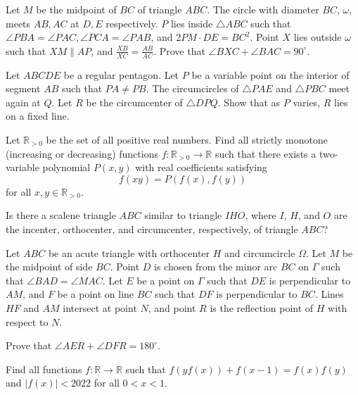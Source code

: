 \documentclass[11pt]{scrartcl}
\begin{document}
\begin{problem}[591652153716935]
	Let $M$ be the midpoint of $BC$ of triangle $ABC$. The circle with diameter $BC$, $\omega$, meets $AB,AC$ at $D,E$ respectively. $P$ lies inside $\triangle ABC$ such that $\angle PBA=\angle PAC, \angle PCA=\angle PAB$, and $2PM\cdot DE=BC^2$. Point $X$ lies outside $\omega$ such that $XM\parallel AP$, and $\frac{XB}{XC}=\frac{AB}{AC}$. Prove that $\angle BXC +\angle BAC=90^{\circ}$.
\end{problem}
\begin{problem}[6020628633767269011]
Let \(ABCDE\) be a regular pentagon. Let \(P\) be a variable point on the interior of segment \(AB\) such that \(PA\ne PB\). The circumcircles of \(\triangle PAE\) and \(\triangle PBC\) meet again at \(Q\). Let \(R\) be the circumcenter of \(\triangle DPQ\). Show that as \(P\) varies, \(R\) lies on a fixed line.
\end{problem}
\begin{problem}[361772755079059]
Let $\mathbb{R}_{>0}$ be the set of all positive real numbers. Find all strictly monotone (increasing or decreasing) functions $f:\mathbb{R}_{>0} \to \mathbb{R}$ such that there exists a two-variable polynomial $P(x, y)$ with real coefficients satisfying
$$
f(xy)=P(f(x), f(y))
$$for all $x, y\in\mathbb{R}_{>0}$.
\end{problem}
\begin{problem}[2672133756769464425]
Is there a scalene triangle $ABC$ similar to triangle $IHO$, where $I$, $H$, and $O$ are the incenter, orthocenter, and circumcenter, respectively, of triangle $ABC$?
\end{problem}
\begin{problem}[227919487650283]
Let $ABC$ be an acute triangle with orthocenter $H$ and circumcircle $\Omega$. Let $M$ be the midpoint of side $BC$. Point $D$ is chosen from the minor arc $BC$ on $\Gamma$ such that $\angle BAD = \angle MAC$. Let $E$ be a point on $\Gamma$ such that $DE$ is perpendicular to $AM$, and $F$ be a point on line $BC$ such that $DF$ is perpendicular to $BC$. Lines $HF$ and $AM$ intersect at point $N$, and point $R$ is the reflection point of $H$ with respect to $N$.

Prove that $\angle AER + \angle DFR = 180^\circ$.
\end{problem}
\begin{problem}[7016087217872166929]
Find all functions $f: \mathbb{R} \rightarrow \mathbb{R}$ such that $f(yf(x))+f(x-1)=f(x)f(y)$ and $|f(x)|<2022$ for all $0<x<1$.
\end{problem}
\end{document}
